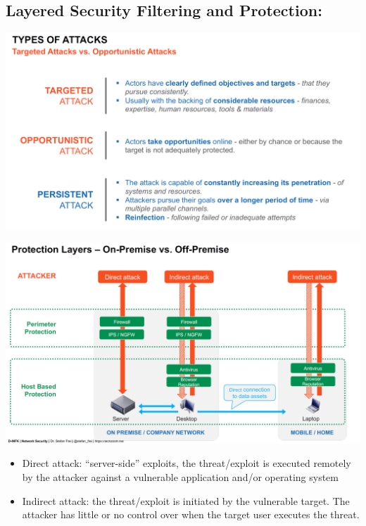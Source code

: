 \subsection{Layered Security Filtering and Protection:}

\begin{minipage}{\linewidth}
    \centering      
    \includegraphics[width=\linewidth]{Figures/IDS_attack_types.PNG} 
\end{minipage}

\begin{minipage}{\linewidth}
    \centering      
    \includegraphics[width=\linewidth]{Figures/IDS_protection_layers.PNG} 
\end{minipage}

\begin{itemize}
	\item Direct attack: “server-side” exploits, the threat/exploit is executed remotely by the attacker against a vulnerable application and/or operating system
	\item Indirect attack: the threat/exploit is initiated by the vulnerable target. The attacker has little or no control over when the target user executes the threat.
\end{itemize}


